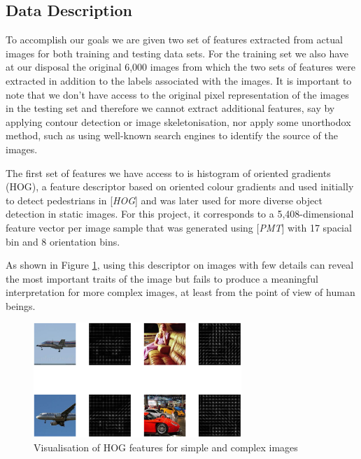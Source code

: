 \documentclass{article} %
\begin{document}
\subsection{Data Description}

To accomplish our goals we are given two set of features extracted from actual images for both training and testing data sets. For the training set we also have at our disposal the original 6,000 images from which the two sets of features were extracted in addition to the labels associated with the images. It is important to note that we don't have access to the original pixel representation of the images in the testing set and therefore we cannot extract additional features, say by applying contour detection or image skeletonisation, nor apply some unorthodox method, such as using well-known search engines to identify the source of the images.

The first set of features we have access to is histogram of oriented gradients (HOG), a feature descriptor based on oriented colour gradients and used initially to detect pedestrians in [\textit{HOG}]
and was later used for more diverse object detection in static images. For this project, it corresponds to a 5,408-dimensional feature vector per image sample that was generated using [\textit{PMT}] with 17 spacial bin and 8 orientation bins.

As shown in Figure \ref{fig:illustration-hog}, using this descriptor on images with few details can reveal the most important traits of the image but fails to produce a meaningful interpretation for more complex images, at least from the point of view of human beings.

\begin{figure}[h]
  \center
  \includegraphics[width=0.7\textwidth]{figures/illustration_hog}
  \caption{Visualisation of HOG features for simple and complex images}
  \label{fig:illustration-hog}
\end{figure}
\end{document}
